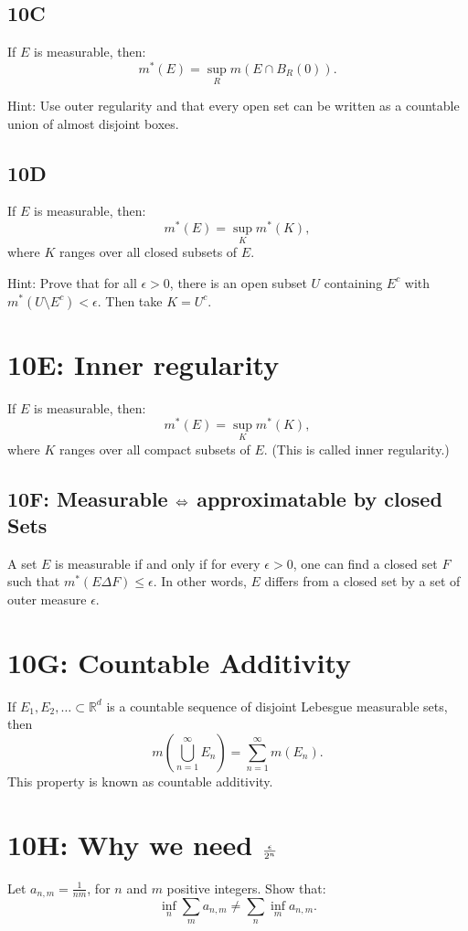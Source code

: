 \documentclass[lang=cn,11pt]{template}
\begin{document}
\subsection*{10C}
If \( E \) is measurable, then:
\[
m^*(E) = \sup_R m(E \cap B_R(0)).
\]

\begin{remark}
Hint: Use outer regularity and that every open set can be written as a countable union of almost disjoint boxes.
\end{remark}

\subsection*{10D}
If \( E \) is measurable, then:
\[
m^*(E) = \sup_K m^*(K),
\]
where \( K \) ranges over all closed subsets of \( E \).

\begin{remark}
Hint: Prove that for all \( \epsilon > 0 \), there is an open subset \( U \) containing \( E^c \) with \( m^*(U \setminus E^c) < \epsilon \). Then take \( K = U^c \).
\end{remark}

\section*{10E: Inner regularity}
\begin{theorem}
If \( E \) is measurable, then:
\[
m^*(E) = \sup_K m^*(K),
\]
where \( K \) ranges over all compact subsets of \( E \). (This is called inner regularity.)
\end{theorem}





\subsection*{10F: Measurable $\Leftrightarrow$ approximatable by closed Sets}
A set \( E \) is measurable if and only if for every \( \epsilon > 0 \), one can find a closed set \( F \) such that \( m^*(E \Delta F) \leq \epsilon \). In other words, \( E \) differs from a closed set by a set of outer measure \( \epsilon \).

\section*{10G: Countable Additivity}
\begin{theorem}
If \( E_1, E_2, \dots \subset \mathbb{R}^d \) is a countable sequence of disjoint Lebesgue measurable sets, then
\[
m\left( \bigcup_{n=1}^{\infty} E_n \right) = \sum_{n=1}^{\infty} m(E_n).
\]
This property is known as countable additivity.
\end{theorem}




\section*{10H: Why we need $\epsilon \over {2^n}$}
Let \( a_{n,m} = \frac{1}{nm} \), for \( n \) and \( m \) positive integers. Show that:
\[
\inf_n \sum_m a_{n,m} \neq \sum_n \inf_m a_{n,m}.
\]

\end{document}
